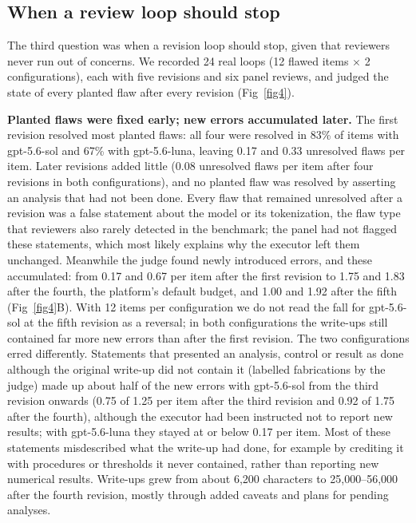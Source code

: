 \subsection*{When a review loop should stop}

The third question was when a revision loop should stop, given that reviewers never run out of concerns. We recorded 24 real loops (12 flawed items $\times$ 2 configurations), each with five revisions and six panel reviews, and judged the state of every planted flaw after every revision (Fig~\ref{fig4}).

\textbf{Planted flaws were fixed early; new errors accumulated later.} The first revision resolved most planted flaws: all four were resolved in 83\% of items with gpt-5.6-sol and 67\% with gpt-5.6-luna, leaving 0.17 and 0.33 unresolved flaws per item. Later revisions added little (0.08 unresolved flaws per item after four revisions in both configurations), and no planted flaw was resolved by asserting an analysis that had not been done. Every flaw that remained unresolved after a revision was a false statement about the model or its tokenization, the flaw type that reviewers also rarely detected in the benchmark; the panel had not flagged these statements, which most likely explains why the executor left them unchanged. Meanwhile the judge found newly introduced errors, and these accumulated: from 0.17 and 0.67 per item after the first revision to 1.75 and 1.83 after the fourth, the platform's default budget, and 1.00 and 1.92 after the fifth (Fig~\ref{fig4}B). With 12 items per configuration we do not read the fall for gpt-5.6-sol at the fifth revision as a reversal; in both configurations the write-ups still contained far more new errors than after the first revision. The two configurations erred differently. Statements that presented an analysis, control or result as done although the original write-up did not contain it (labelled fabrications by the judge) made up about half of the new errors with gpt-5.6-sol from the third revision onwards (0.75 of 1.25 per item after the third revision and 0.92 of 1.75 after the fourth), although the executor had been instructed not to report new results; with gpt-5.6-luna they stayed at or below 0.17 per item. Most of these statements misdescribed what the write-up had done, for example by crediting it with procedures or thresholds it never contained, rather than reporting new numerical results. Write-ups grew from about 6,200 characters to 25,000--56,000 after the fourth revision, mostly through added caveats and plans for pending analyses.

